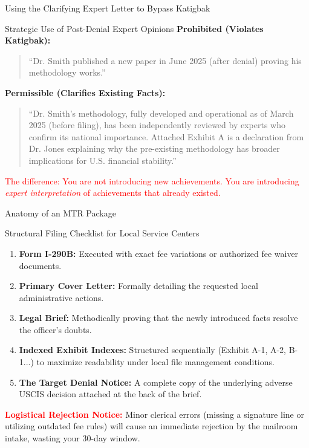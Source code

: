 \documentclass[11pt]{beamer}
\begin{document}
	\begin{frame}{Using the Clarifying Expert Letter to Bypass Katigbak}
		\scriptsize
		\begin{block}{Strategic Use of Post-Denial Expert Opinions}
			\textbf{Prohibited (Violates Katigbak):}
			\begin{quote}
				``Dr. Smith published a new paper in June 2025 (after denial) proving his methodology works.''
			\end{quote}
			\textbf{Permissible (Clarifies Existing Facts):}
			\begin{quote}
				``Dr. Smith's methodology, fully developed and operational as of March 2025 (before filing), has been independently reviewed by experts who confirm its national importance. Attached Exhibit A is a declaration from Dr. Jones explaining why the pre-existing methodology has broader implications for U.S. financial stability.''
			\end{quote}
			\textcolor{red}{The difference: You are not introducing new achievements. You are introducing \textit{expert interpretation} of achievements that already existed.}
		\end{block}
	\end{frame}
	
	\begin{frame}{Anatomy of an MTR Package}
		\scriptsize
		\begin{block}{Structural Filing Checklist for Local Service Centers}
			\begin{enumerate}
				\item \textbf{Form I-290B:} Executed with exact fee variations or authorized fee waiver documents.
				\item \textbf{Primary Cover Letter:} Formally detailing the requested local administrative actions.
				\item \textbf{Legal Brief:} Methodically proving that the newly introduced facts resolve the officer's doubts.
				\item \textbf{Indexed Exhibit Indexes:} Structured sequentially (Exhibit A-1, A-2, B-1...) to maximize readability under local file management conditions.
				\item \textbf{The Target Denial Notice:} A complete copy of the underlying adverse USCIS decision attached at the back of the brief.
			\end{enumerate}
			\vspace{0.1in}
			\textcolor{red}{\textbf{Logistical Rejection Notice:}} Minor clerical errors (missing a signature line or utilizing outdated fee rules) will cause an immediate rejection by the mailroom intake, wasting your 30-day window.
		\end{block}
	\end{frame}
	
\end{document}
